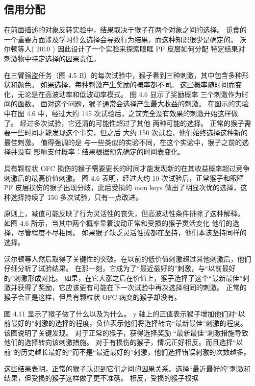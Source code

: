 \subsection{信用分配}
在前面描述的对象反转实验中，结果取决于猴子在两个对象之间的选择。 觅食的一个重要方面涉及学习什么选择会导致行为结果，而这种知识很少是确定的。 沃尔顿等人( 2010 ) 因此设计了一个实验来探索眼眶 PF 皮层如何分配
特定结果对刺激物中特定选择的因果责任。\par
在三臂强盗任务（图 4.5 B）的每次试验中，猴子看到三种刺激，其中包含多种形状和颜色。 如果选择，每种刺激产生奖励的概率都不同。 这些概率随时间而变化，无论是在高波动率和低波动率模式。 图 4.6 显示了奖励概率
三个刺激作为时间的函数。 面对这个问题，猴子通常会选择产生最大收益的刺激。 在图示的实验中在图 4.6 中，经过大约 145 次试验后，之前完全没有效果的刺激开始这样做了。 经过多次试验，它还清的可能性超过了其他
两种可能的选择。 正常的猴子需要一些时间才能发现这个事实，但之后
大约 150 次试验，他们始终选择这种新的最佳刺激。 值得强调的是
与一些类似的实验不同，在这个实验中，猴子之前的选择并没有
影响支付概率：结果根据预先确定的时间表变化。\par
具有颗粒状 OFC 损伤的猴子需要更长的时间才能发现新的在其收益概率超过竞争刺激后的最高价值刺激。 图 4.6 表明，经过大约 10 次试验后，正常猴子和眼眶 PF 皮层损伤的猴子出现分歧，此后受损的 mon keys 做出了明显次优的选择，这种选择持续了 150 多次试验，只有一点改进。\par
原则上，减值可能反映了行为灵活性的丧失，但高波动性条件排除了这种解释。 如图 4.6 所示，当其中两个概率显着波动正常和受损的猴子灵活变化
他们的选择，尽管程度不尽相同。 如果猴子缺乏灵活性或都在坚持，他们本该坚持同样的选择。\par
沃尔顿等人然后取得了关键性的突破。在以前的低价值刺激超过其他刺激后，他们仔细分析了试验结果。 在那一刻，它成为了“最近最好的”刺激，与“以前最好的”刺激形成对比。 如果，在它大涨之后在价值上，猴子选择了这个“最新最佳”刺激并获得了奖励，它应该更有可能在下一次试验中再次选择相同的刺激。 正常的猴子会正是这样，但具有颗粒状 OFC 病变的猴子却没有。\par
图 4.11 显示了猴子做了什么以及为什么。 y 轴上的正值表示猴子增加他们对“以前最好的”刺激的选择的程度。负值表示他们将选择转向“最新最佳”刺激的程度。该图说明了关键发现。 对于正常的猴子，获得选择奖励
“最新最佳”刺激措施导致他们的选择转向该刺激措施。 对于有损伤的猴子，情况正好相反。而且选择“以前”的历史越长最好的”而不是“最近最好的”刺激，他们选择错误刺激的次数越多。\par
这些结果表明，正常的猴子认识到它们之间的因果关系。选择“最近最好的”刺激和结果，但受损的猴子这样做了更不准确。 相反，受损的猴子根据
